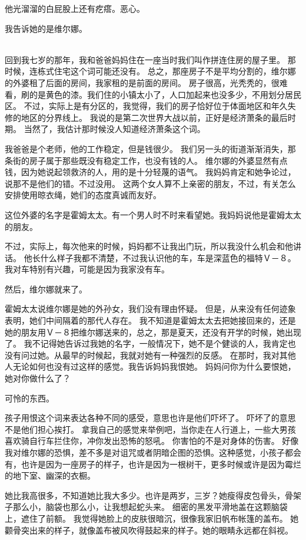 \documentclass[UTF8]{ctexart}
\begin{document}
他光溜溜的白屁股上还有疙瘩。恶心。

我告诉她的是维尔娜。

~\\

回到我七岁的那年，我和爸爸妈妈住在一座当时我们叫作拼连住房的屋子里。
那时候，连栋式住宅这个词可能还没有。
总之，那座房子不是平均分割的，维尔娜的外婆租了后面的房间，我家租的是前面的房间。
房子很高，光秃秃的，很难看，刷的是黄色的漆。我们住的小镇太小了，人口加起来也没多少，不用划分居民区。
不过，实际上是有分区的，我觉得，我们的房子恰好位于体面地区和年久失修的地区的分界线上。
我说的是第二次世界大战以前，正好是经济萧条的最后时期。
当然了，我估计那时候没人知道经济萧条这个词。

我爸爸是个老师，他的工作稳定，但是钱很少。
我们另一头的街道渐渐消失，那条街的房子属于那些既没有稳定工作，也没有钱的人。
维尔娜的外婆显然有点钱，因为她说起领救济的人，用的是十分轻蔑的语气。
我妈妈肯定和她争论过，说那不是他们的错。不过没用。
这两个女人算不上亲密的朋友，不过，有关怎么安排使用晾衣绳，她们的态度真诚而友好。

这位外婆的名字是霍姆太太。有一个男人时不时来看望她。我妈妈说他是霍姆太太的朋友。

不过，实际上，每次他来的时候，妈妈都不让我出门玩，所以我没什么机会和他讲话。
他长什么样子我都不清楚，不过我认识他的车，车是深蓝色的福特Ｖ－８。
我对车特别有兴趣，可能是因为我家没有车。

然后，维尔娜就来了。

霍姆太太说维尔娜是她的外孙女，我们没有理由怀疑。
但是，从来没有任何迹象表明，她们中间隔着的那代人存在。
我不知道是霍姆太太去把她接回来的，还是她的朋友用Ｖ－８把维尔娜送来的，总之，那是夏天，还没有开学的时候，她出现了。
我不记得她告诉过我她的名字，一般情况下，她不是个健谈的人，我肯定也没有问过她。从最早的时候起，我就对她有一种强烈的反感。
在那时，我对其他人无论如何也没有过这样的感觉。我告诉妈妈我恨她。
妈妈问你为什么要恨她，她对你做什么了？

可怜的东西。

孩子用恨这个词来表达各种不同的感受，意思也许是他们吓坏了。
吓坏了的意思不是他们担心挨打。
拿我自己的感觉来举例吧，当你走在人行道上，一些大男孩喜欢骑自行车拦住你，冲你发出恐怖的怒吼。
你害怕的不是对身体的伤害。
好像我对维尔娜的恐惧，差不多是对诅咒或者阴暗企图的恐惧。这种感觉，小孩子都会有，也许是因为一座房子的样子，也许是因为一根树干，更多时候或许是因为霉烂的地下室、幽深的衣橱。

她比我高很多，不知道她比我大多少。也许是两岁，三岁？她瘦得皮包骨头，骨架子那么小，脑袋也那么小，让我想起蛇头来。
细密的黑发平滑地盖在这颗脑袋上，遮住了前额。
我觉得她脸上的皮肤很暗沉，很像我家旧帆布帐篷的盖布。
她颧骨突出来的样子，就像盖布被风吹得鼓起来的样子。她的眼睛永远都在斜视。
\end{document}
